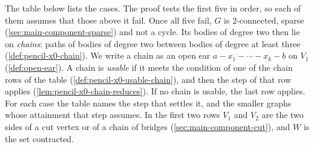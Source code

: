 The table below lists the cases. The proof tests the first five in
order, so each of them assumes that those above it fail. Once all five
fail, $G$ is 2-connected, sparse (\cref{sec:main-component-sparse}) and
not a cycle. Its bodies of degree two then lie on \emph{chains}: paths
of bodies of degree two between bodies of degree at least three
(\cref{def:pencil-x0-chain}). We write a chain as an open ear
$a - x_1 - \cdots - x_k - b$ on $V_1$ (\cref{def:open-ear}).
A chain is \emph{usable} if it meets the condition of one of the chain
rows of the table (\cref{def:pencil-x0-usable-chain}), and then the step
of that row applies (\cref{lem:pencil-x0-chain-reduces}). If no chain is
usable, the last row applies. For each case the table names the step
that settles it, and the smaller graphs whose attainment that step
assumes. In the first two rows $V_1$ and $V_2$ are the two sides of a
cut vertex or of a chain of bridges (\cref{sec:main-component-cut}), and
$W$ is the set contracted.
